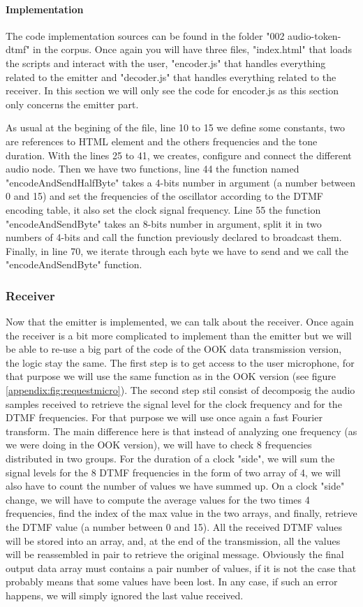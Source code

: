 \documentclass[twocolumn,14pt]{extarticle}
\begin{document}
\paragraph{Implementation}
The code implementation sources can be found in the folder "002 audio-token-dtmf" in the corpus. Once again you will have three files, "index.html" that loads the scripts and interact with the user, "encoder.js" that handles everything related to the emitter and "decoder.js" that handles everything related to the receiver. In this section we will only see the code for encoder.js as this section only concerns the emitter part.

As usual at the begining of the file, line 10 to 15 we define some constants, two are references to HTML element and the others frequencies and the tone duration. With the lines 25 to 41, we creates, configure and connect the different audio node. Then we have two functions, line 44 the function named "encodeAndSendHalfByte" takes a 4-bits number in argument (a number between 0 and 15) and set the frequencies of the oscillator according to the DTMF encoding table, it also set the clock signal frequency. Line 55 the function "encodeAndSendByte" takes an 8-bits number in argument, split it in two numbers of 4-bits and call the function previously declared to broadcast them. Finally, in line 70, we iterate through each byte we have to send and we call the "encodeAndSendByte" function.

\subsubsection{Receiver}
Now that the emitter is implemented, we can talk about the receiver. Once again the receiver is a bit more complicated to implement than the emitter but we will be able to re-use a big part of the code of the OOK data transmission version, the logic stay the same. The first step is to get access to the user microphone, for that purpose we will use the same function as in the OOK version (see figure \ref{appendix:fig:requestmicro}). The second step stil consist of decomposig the audio samples received to retrieve the signal level for the clock frequency and for the DTMF frequencies. For that purpose we will use once again a fast Fourier transform. The main difference here is that instead of analyzing one frequency (as we were doing in the OOK version), we will have to check 8 frequencies distributed in two groups. For the duration of a clock "side", we will sum the signal levels for the 8 DTMF frequencies in the form of two array of 4, we will also have to count the number of values we have summed up. On a clock "side" change, we will have to compute the average values for the two times 4 frequencies, find the index of the max value in the two arrays, and finally, retrieve the DTMF value (a number between 0 and 15). All the received DTMF values will be stored into an array, and, at the end of the transmission, all the values will be reassembled in pair to retrieve the original message. Obviously the final output data array must contains a pair number of values, if it is not the case that probably means that some values have been lost. In any case, if such an error happens, we will simply ignored the last value received.
\end{document}
